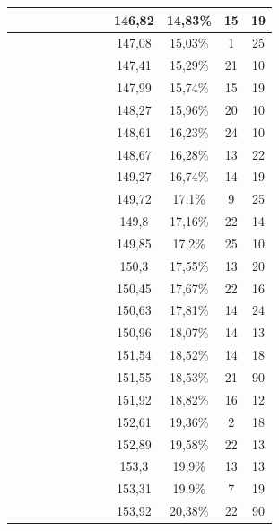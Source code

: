 \begin{center}
\begin{longtable}{|c|c|c|c|c|c|c|c|c|c|c|c|}
 \x &  &  \x &  &  \x &  &  &  & 146,82 & 14,83\% & 15 & 19  \\ \hline
 \x &  \x &  &  &  &  &  \x &  \x & 147,08 & 15,03\% & 1 & 25  \\ \hline
 \x &  &  &  \x &  &  &  &  & 147,41 & 15,29\% & 21 & 10  \\ \hline
 \x &  \x &  &  \x &  \x &  \x &  \x &  \x & 147,99 & 15,74\% & 15 & 19  \\ \hline
 \x &  \x &  \x &  \x &  &  \x &  \x &  & 148,27 & 15,96\% & 20 & 10  \\ \hline
 \x &  &  \x &  \x &  \x &  \x &  &  & 148,61 & 16,23\% & 24 & 10  \\ \hline
 \x &  &  &  \x &  \x &  &  &  \x & 148,67 & 16,28\% & 13 & 22  \\ \hline
 \x &  &  &  \x &  &  &  &  \x & 149,27 & 16,74\% & 14 & 19  \\ \hline
 \x &  &  &  &  &  &  &  & 149,72 & 17,1\% & 9 & 25  \\ \hline
 \x &  &  \x &  &  &  &  \x &  & 149,8 & 17,16\% & 22 & 14  \\ \hline
 \x &  \x &  \x &  \x &  &  \x &  &  & 149,85 & 17,2\% & 25 & 10  \\ \hline
 \x &  &  &  &  &  \x &  \x &  \x & 150,3 & 17,55\% & 13 & 20  \\ \hline
 \x &  \x &  \x &  \x &  &  &  \x &  & 150,45 & 17,67\% & 22 & 16  \\ \hline
 \x &  &  \x &  \x &  \x &  &  &  & 150,63 & 17,81\% & 14 & 24  \\ \hline
 \x &  &  \x &  \x &  &  \x &  &  & 150,96 & 18,07\% & 14 & 13  \\ \hline
 \x &  &  \x &  &  \x &  \x &  &  & 151,54 & 18,52\% & 14 & 18  \\ \hline
 \x &  &  &  &  \x &  \x &  &  \x & 151,55 & 18,53\% & 21 & 90  \\ \hline
 \x &  &  \x &  &  &  \x &  \x &  \x & 151,92 & 18,82\% & 16 & 12  \\ \hline
 \x &  \x &  &  &  \x &  \x &  \x &  & 152,61 & 19,36\% & 2 & 18  \\ \hline
 \x &  \x &  \x &  &  \x &  &  \x &  & 152,89 & 19,58\% & 22 & 13  \\ \hline
 \x &  \x &  &  &  &  &  \x &  & 153,3 & 19,9\% & 13 & 13  \\ \hline
 \x &  \x &  &  &  \x &  &  \x &  & 153,31 & 19,9\% & 7 & 19  \\ \hline
 \x &  &  &  &  &  &  \x &  & 153,92 & 20,38\% & 22 & 90  \\ \hline

\end{longtable}
\end{center}
